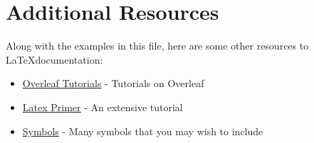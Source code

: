 \documentclass[10pt]{article}
\begin{document}
\section*{Additional Resources}

Along with the examples in this file, here are some other resources to \LaTeX documentation:

\begin{itemize}
    \item \href{https://www.overleaf.com/learn/latex/Tutorials}{Overleaf Tutorials} - Tutorials on Overleaf
    \item \href{https://www.maths.tcd.ie/~dwilkins/LaTeXPrimer/}{Latex Primer} - An extensive tutorial
    \item \href{http://www.cs.put.poznan.pl/ksiek/latexmath.html#set-theory}{Symbols} - Many symbols that you may wish to include
\end{itemize}



\end{document}
